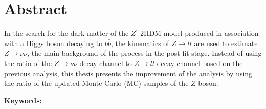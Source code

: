 \documentclass[class=NTHU_thesis, crop=false]{standalone}
\begin{document}
\chapter{Abstract}
In the search for the dark matter of the $Z^\prime$-2HDM model produced in association with a Higgs boson decaying to $b\bar{b}$, the kinematics of $Z \to ll$ are used to estimate $Z \to \nu\nu$, the main background of the process in the post-fit stage. Instead of using the ratio of the $Z \to \nu\nu$ decay channel to $Z \to ll$ decay channel based on the previous analysis, this thesis presents the improvement of the analysis by using the ratio of the updated Monte-Carlo (MC) samples of the $Z$ boson.

\vspace{2em}
\noindent \textbf{Keywords:} \keywordsEn{} %
\end{document}
